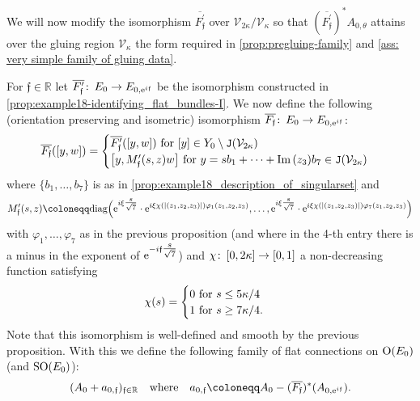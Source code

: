\documentclass[11pt,a4paper]{scrartcl}
\newcommand{\col}{\colon \thinspace}
\newcommand{\e}{\textup{e}}
\newcommand{\im}{\textup{Im}\thinspace }
\newcommand{\SO}{\textup{SO}}
\renewcommand{\O}{\textup{O}}
\numberwithin{equation}{section}
\theoremstyle{plain}
\theoremstyle{definition}
\theoremstyle{remark}
\begin{document}
We will now modify the isomorphism $\overline{F_\mathfrak{f}^\prime}$ over $\mathcal{V}_{2\kappa}/\mathcal{V}_\kappa$ so that $(\overline{F_\mathfrak{f}^\prime})^*A_{0,\theta}$ attains over the gluing region $\mathcal{V}_\kappa$ the form required in \autoref{prop:pregluing-family} and \autoref{ass: very simple family of gluing data}.

\begin{definition}\label{def:example18_identifying_flat_bundles-II}
For $\mathfrak{f}\in \mathbb{R}$ let $\overline{F_\mathfrak{f}^\prime} \col E_0 \to E_{0,\e^{i\mathfrak{f}}}$ be the isomorphism constructed in \autoref{prop:example18-identifying_flat_bundles-I}. We now define the following (orientation preserving and isometric) isomorphism $\overline{F_\mathfrak{f}}\col E_0 \to E_{0,\e^{i\mathfrak{f}}}$:
\begin{align*}
\overline{F_\mathfrak{f}}([y,w]) = \begin{cases}
\overline{F_\mathfrak{f}^\prime}([y,w]) \textup{ for $[y] \in Y_0 \setminus \mathtt{J}(\mathcal{V}_{2\kappa})$} \\
\big[y,M_\mathfrak{f}^\prime(s,z)w\big] \textup{ for $y=s b_1+\dots+ \im (z_3) b_7 \in \mathtt{J}(\mathcal{V}_{2\kappa})$}
\end{cases}
\end{align*}
where $\{b_1,\dots,b_7\}$ is as in \autoref{prop:example18_description_of_singularset} and  \[ M_\mathfrak{f}^\prime(s,z) \coloneqq \textup{diag}\Big(\e^{i\xi\tfrac{s}{\sqrt{7}}}\cdot\e^{i\xi \chi(\vert(z_1,z_2,z_3)\vert)\varphi_1(z_1,z_2,z_3)},\dots,\e^{i\xi\tfrac{s}{\sqrt{7}}}\cdot\e^{i\xi\chi(\vert(z_1,z_2,z_3)\vert)\varphi_7(z_1,z_2,z_3)} \Big) \] with $\varphi_1,\dots,\varphi_7$ as in the previous proposition (and where in the 4-th entry there is a minus in the exponent of $\e^{-i\mathfrak{f}\tfrac{s}{\sqrt{7}}}$) and $\chi \col [0,2\kappa]\to [0,1]$ a non-decreasing function satisfying 
\begin{align*}
\chi(s) = \begin{cases}
0 \textup{ for $s \leq 5\kappa/4$} \\
1 \textup{ for $s \geq 7\kappa/4$.}
\end{cases}
\end{align*}
Note that this isomorphism is well-defined and smooth by the previous proposition. With this we define the following family of flat connections on $\O(E_0)$ (and $\SO(E_0)$): \[(A_0+a_{0,\mathfrak{f}})_{\mathfrak{f}\in \mathbb{R}} \quad \textup{where} \quad a_{0,\mathfrak{f}} \coloneqq A_0 - (\overline{F_\mathfrak{f}})^*(A_{0,\e^{i\mathfrak{f}}}).\]
\end{definition}
\end{document}
